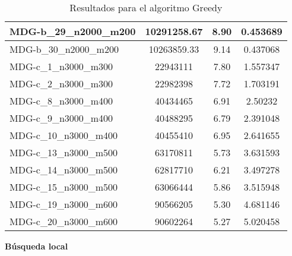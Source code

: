 \documentclass[11pt,a4paper]{article}
\begin{document}
\begin{table}[H]
\begin{center}
\begin{tabular}{|l|c|c|c|}
			MDG-b\_29\_n2000\_m200 & 10291258.67 & 8.90 & 0.453689 \\ \hline
			MDG-b\_30\_n2000\_m200 & 10263859.33 & 9.14 & 0.437068 \\ \hline
			MDG-c\_1\_n3000\_m300 & 22943111 & 7.80 & 1.557347 \\ \hline
			MDG-c\_2\_n3000\_m300 & 22982398 & 7.72 & 1.703191 \\ \hline
			MDG-c\_8\_n3000\_m400 & 40434465 & 6.91 & 2.50232 \\ \hline
			MDG-c\_9\_n3000\_m400 & 40488295 & 6.79 & 2.391048 \\ \hline
			MDG-c\_10\_n3000\_m400 & 40455410 & 6.95 & 2.641655 \\ \hline
			MDG-c\_13\_n3000\_m500 & 63170811 & 5.73 & 3.631593 \\ \hline
			MDG-c\_14\_n3000\_m500 & 62817710 & 6.21 & 3.497278 \\ \hline
			MDG-c\_15\_n3000\_m500 & 63066444 & 5.86 & 3.515948 \\ \hline
			MDG-c\_19\_n3000\_m600 & 90566205 & 5.30 & 4.681146 \\ \hline
			MDG-c\_20\_n3000\_m600 & 90602264 & 5.27 & 5.020458 \\ \hline
		\end{tabular}
	\end{center}
	\caption{Resultados para el algoritmo Greedy}
	\label{}
\end{table}
\newpage
\textbf{Búsqueda local}
\end{document}
